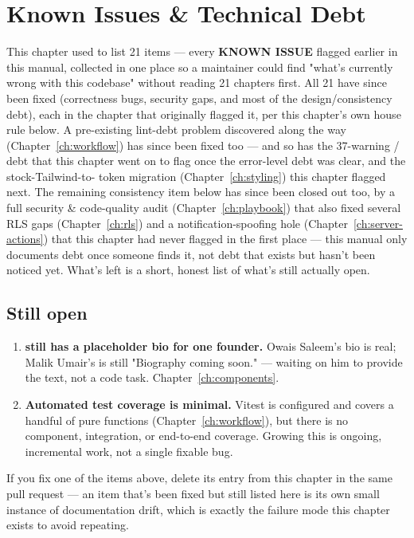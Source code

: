 \chapter{Known Issues \& Technical Debt}
\label{ch:known-issues}

This chapter used to list 21 items — every \textbf{KNOWN ISSUE} flagged earlier in this manual, collected in one place so a maintainer could find "what's currently wrong with this codebase" without reading 21 chapters first. All 21 have since been fixed (correctness bugs, security gaps, and most of the design/consistency debt), each in the chapter that originally flagged it, per this chapter's own house rule below. A pre-existing lint-debt problem discovered along the way (Chapter~\ref{ch:workflow}) has since been fixed too — and so has the 37-warning / debt that this chapter went on to flag once the error-level debt was clear, and the stock-Tailwind-to- token migration (Chapter~\ref{ch:styling}) this chapter flagged next. The remaining  consistency item below has since been closed out too, by a full security \& code-quality audit (Chapter~\ref{ch:playbook}) that also fixed several RLS gaps (Chapter~\ref{ch:rls}) and a notification-spoofing hole (Chapter~\ref{ch:server-actions}) that this chapter had never flagged in the first place — this manual only documents debt once someone finds it, not debt that exists but hasn't been noticed yet. What's left is a short, honest list of what's still actually open.

\section{Still open}

\begin{enumerate}
  \item \textbf{ still has a placeholder bio for one founder.} Owais Saleem's bio is real; Malik Umair's is still "Biography coming soon." — waiting on him to provide the text, not a code task. Chapter~\ref{ch:components}.
  \item \textbf{Automated test coverage is minimal.} Vitest is configured and covers a handful of pure functions (Chapter~\ref{ch:workflow}), but there is no component, integration, or end-to-end coverage. Growing this is ongoing, incremental work, not a single fixable bug.
\end{enumerate}

\begin{olknote}
If you fix one of the items above, delete its entry from this chapter in the same pull request — an item that's been fixed but still listed here is its own small instance of documentation drift, which is exactly the failure mode this chapter exists to avoid repeating.
\end{olknote}
